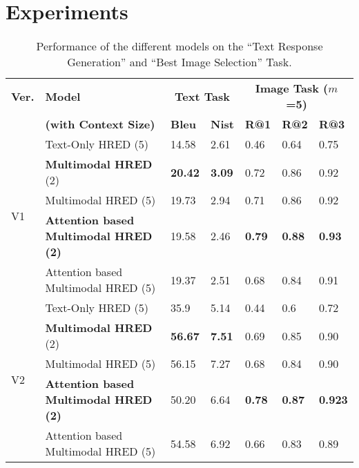 \documentclass[letterpaper]{article} %
\begin{document}
\section{Experiments}
\label{Sec:Experiments}
\begin{table}[!ht]
\centering
{%
{\scriptsize
\captionsetup{font=small}
\begin{tabular}{|m{0.4cm}|m{2.1cm}|m{0.55cm}|m{0.55cm}|m{0.55cm}|m{0.55cm}|m{0.55cm}|}\hline
       \textbf{Ver.} & \textbf{Model} & \multicolumn{2}{c|}{\textbf{Text Task}} & \multicolumn{3}{c|}{\textbf{Image Task ($m$=5)}} \\ \cline{3-7}
     &\textbf{(with Context Size)} & \textbf{Bleu} & \textbf{Nist} & \textbf{R@1} & \textbf{R@2} & \textbf{R@3} \\ \hline
    \multirow{ 5}{*}{V1} & Text-Only HRED (5) & 14.58 & 2.61 & 0.46 & 0.64 & 0.75\\ \cline{2-7}
    & \textbf{Multimodal HRED} (2) & \textbf{20.42} & \textbf{3.09} & 0.72 & 0.86 & 0.92 \\ \cline{2-7}
    & Multimodal HRED (5) & 19.73 & 2.94 & 0.71 & 0.86 & 0.92\\ \cline{2-7}
    & \textbf{Attention based Multimodal HRED (2)} & 19.58 & 2.46 & \textbf{0.79} & \textbf{0.88} & \textbf{0.93} \\ \cline{2-7}
    & Attention based Multimodal HRED (5) & 19.37 &2.51 & 0.68 & 0.84 & 0.91\\ \hline\hline
    
    \multirow{ 8}{*}{V2} & Text-Only HRED (5) & 35.9 & 5.14 & 0.44 & 0.6 & 0.72\\ \cline{2-7}
    & \textbf{Multimodal HRED} (2) & \textbf{56.67} & \textbf{7.51} & 0.69 & 0.85 & 0.90\\ \cline{2-7}
    & Multimodal HRED (5) & 56.15 & 7.27 & 0.68 & 0.84 & 0.90\\ \cline{2-7}
    & \textbf{Attention based Multimodal HRED (2)} & 50.20 & 6.64 & \textbf{0.78} & \textbf{0.87} & \textbf{0.923}\\ \cline{2-7}
    & Attention based Multimodal HRED (5) & 54.58 & 6.92 & 0.66 & 0.83 & 0.89\\ \hline
\end{tabular}
}
}
\caption{\label{tab:results} Performance of the different models on the  ``Text Response Generation'' and ``Best Image Selection'' Task.}

\end{table}
\end{document}
